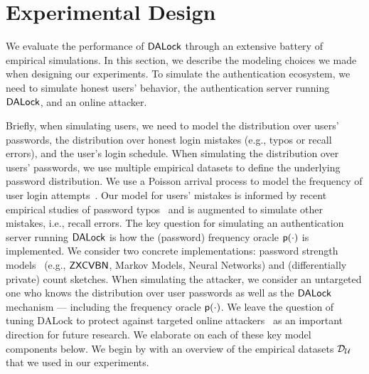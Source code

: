 
\vspace{-0.2cm}

\section{Experimental Design} %

\vspace{-0.1cm}
We evaluate the performance of $\mathsf{DALock}$ through an extensive battery of empirical simulations. In this section, we describe the modeling choices we made when designing our experiments. To simulate the authentication ecosystem, we need to simulate honest users' behavior, the authentication server running $\mathsf{DALock}$, and an online attacker. 



Briefly, when simulating users, we need to model the distribution over users’ passwords, the distribution over honest login mistakes (e.g., typos or recall errors), and the user's login schedule. When simulating the distribution over users’ passwords, we use multiple empirical datasets to define the underlying password distribution. We use a Poisson arrival process to model the frequency of user login attempts~\cite{AC:BloBluDat13}. Our model for users’ mistakes is informed by recent empirical studies of password typos~\cite{CCS:CWPCR17,SP:CAAJR16} and is augmented to simulate other mistakes, i.e., recall errors.  The key question for simulating an authentication server running $\mathsf{DALock}$ is how the (password) frequency oracle $\textsf{p}(\cdot)$ is implemented. We consider two concrete implementations: password strength models~\cite{ USENIX:Wheeler16,USENIX:USBCCKKMMS15,USENIX:MUSKBCC16} (e.g., $\mathsf{ZXCVBN}$, Markov Models, Neural Networks) and (differentially private) count sketches. When simulating the attacker, we consider an untargeted one who knows the distribution over user passwords as well as the $\mathsf{DALock}$ mechanism --- including the frequency oracle $\textsf{p}(\cdot)$. We leave the question of tuning DALock to protect against targeted online attackers~\cite{CCS:WZWYH16} as an important direction for future research. We elaborate on each of these key model components below.  We begin by with an overview of the empirical datasets $\mathcal{D}_{{\mathcal{U}}}$ that we used in our experiments.








